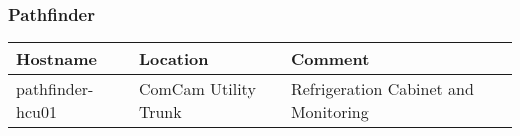 \subsubsection{Pathfinder}

\begin{tabular}{|p{5cm}|p{3cm}|p{5cm}| }
    \hline
    \rowcolor{lightgray}
    Hostname & Location & Comment \\
    \hline
    pathfinder-hcu01 & ComCam Utility Trunk & Refrigeration Cabinet and Monitoring \\
    \hline
\end{tabular}

